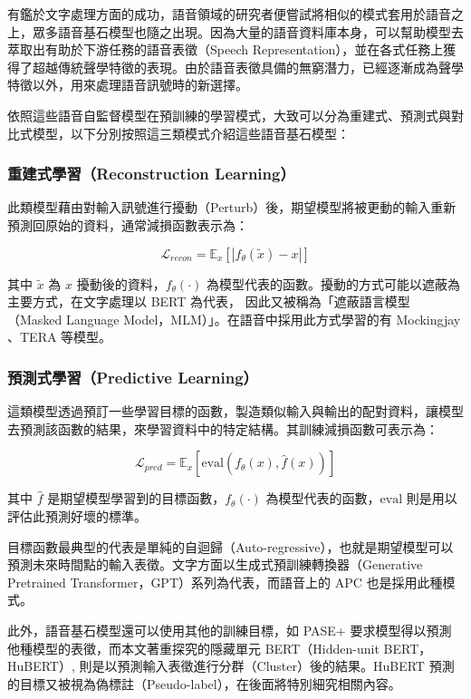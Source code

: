 有鑑於文字處理方面的成功，語音領域的研究者便嘗試將相似的模式套用於語音之上，眾多語音基石模型也隨之出現。因為大量的語音資料庫本身，可以幫助模型去萃取出有助於下游任務的語音表徵（Speech Representation），並在各式任務上獲得了超越傳統聲學特徵的表現。由於語音表徵具備的無窮潛力，已經逐漸成為聲學特徵以外，用來處理語音訊號時的新選擇。

依照這些語音自監督模型在預訓練的學習模式，大致可以分為重建式、預測式與對比式模型，以下分別按照這三類模式介紹這些語音基石模型：

\subsubsection{重建式學習（Reconstruction Learning）}

此類模型藉由對輸入訊號進行擾動（Perturb）後，期望模型將被更動的輸入重新預測回原始的資料，通常減損函數表示為：

$$\mathcal{L}_{recon} = \mathbb{E}_x[|f_\theta(\tilde{x}) - x|]$$

其中 $\tilde{x}$ 為 $x$ 擾動後的資料，$f_\theta(\cdot)$ 為模型代表的函數。擾動的方式可能以遮蔽為主要方式，在文字處理以 BERT 為代表， 因此又被稱為「遮蔽語言模型（Masked Language Model，MLM）」。在語音中採用此方式學習的有 Mockingjay \cite{liu_mockingjay_2019}、TERA \cite{t_tera_2021} 等模型。  %

\subsubsection{預測式學習（Predictive Learning）}

這類模型透過預訂一些學習目標的函數，製造類似輸入與輸出的配對資料，讓模型去預測該函數的結果，來學習資料中的特定結構。其訓練減損函數可表示為：

$$\mathcal{L}_{pred} = \mathbb{E}_x[\text{eval}(f_\theta(x), \hat{f}(x))]$$

其中 $\hat{f}$ 是期望模型學習到的目標函數，$f_\theta(\cdot)$ 為模型代表的函數，$\text{eval}$ 則是用以評估此預測好壞的標準。

目標函數最典型的代表是單純的自迴歸（Auto-regressive），也就是期望模型可以預測未來時間點的輸入表徵。文字方面以生成式預訓練轉換器（Generative Pretrained Transformer，GPT\cite{radford_language_nodate, brown_language_2020}）系列為代表，而語音上的 APC \cite{chung_generative_2020} 也是採用此種模式。

此外，語音基石模型還可以使用其他的訓練目標，如 PASE+ \cite{ravanelli_multi-task_2020} 要求模型得以預測他種模型的表徵，而本文著重探究的隱藏單元 BERT（Hidden-unit BERT，HuBERT）\cite{hsu_hubert_2021, hsu_hubert_2021-2}, 則是以預測輸入表徵進行分群（Cluster）後的結果。HuBERT 預測的目標又被視為偽標註（Pseudo-label），在後面將特別細究相關內容。

